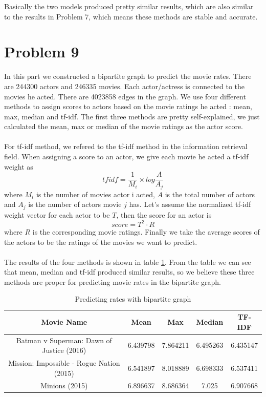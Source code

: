 \documentclass{article}
\begin{document}
\noindent Basically the two models produced pretty similar results, which are also similar to the results in Problem 7, which means these methods are stable and accurate.
\section{Problem 9}
In this part we constructed a bipartite graph to predict the movie rates. There are 244300 actors and 246335 movies. Each actor/actress is connected to the movies he acted. There are 4023858 edges in the graph. We use four different methods to assign scores to actors based on the movie ratings he acted : mean, max, median and tf-idf. The first three methods are pretty self-explained, we just calculated the mean, max or median of the movie ratings as the actor score.\\
\\
 For tf-idf method, we refered to the tf-idf method in the information retrieval field. When assigning a score to an actor, we give each movie he acted a tf-idf weight as
 \begin{equation*}
 tfidf = \frac{1}{M_i} \times log\frac{A}{A_j}
 \end{equation*}
 where $M_i$ is the number of movies actor i acted, $A$ is the total number of actors and $A_j$ is the number of actors movie $j$ has. Let's assume the normalized tf-idf weight vector for each actor to be $T$, then the score for an actor is
 \begin{equation*}
 score = T^2 \cdot R
 \end{equation*}
 where $R$ is the corresponding movie ratings. Finally we take the average scores of the actors to be the ratings of the movies we want to predict.\\
 \\
 The results of the four methods is shown in table \ref{tb:9}. From the table we can see that mean, median and tf-idf produced similar results, so we believe these three methods are proper for predicting movie rates in the bipartite graph.
 \begin {table}[htbp]
\caption{Predicting rates with bipartite graph}
\begin{adjustbox}{center}
\label{tb:9}
\begin{tabular}{|c|c|c|c|c|}
\hline
Movie Name&Mean&Max&Median&TF-IDF\\
\hline
Batman v Superman: Dawn of Justice (2016)&6.439798&7.864211&6.495263&6.435147\\
\hline
Mission: Impossible - Rogue Nation (2015)&6.541897&8.018889&6.698333&6.537411\\
\hline
Minions (2015)&6.896637&8.686364&7.025&6.907668\\
\hline
\end{tabular}
\end{adjustbox}
\end{table}
\end{document}
